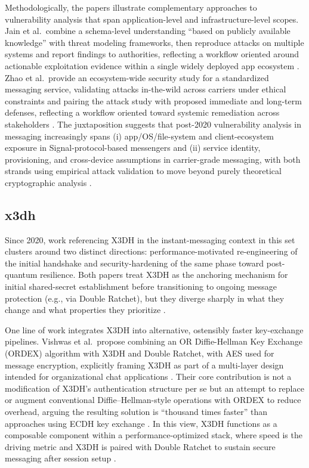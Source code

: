Methodologically, the papers illustrate complementary approaches to vulnerability analysis that span application-level and infrastructure-level scopes. Jain et al.\ combine a schema-level understanding “based on publicly available knowledge” with threat modeling frameworks, then reproduce attacks on multiple systems and report findings to authorities, reflecting a workflow oriented around actionable exploitation evidence within a single widely deployed app ecosystem \cite{jain2021}. Zhao et al.\ provide an ecosystem-wide security study for a standardized messaging service, validating attacks in-the-wild across carriers under ethical constraints and pairing the attack study with proposed immediate and long-term defenses, reflecting a workflow oriented toward systemic remediation across stakeholders \cite{zhao2022}. The juxtaposition suggests that post-2020 vulnerability analysis in messaging increasingly spans (i) app/OS/file-system and client-ecosystem exposure in Signal-protocol-based messengers and (ii) service identity, provisioning, and cross-device assumptions in carrier-grade messaging, with both strands using empirical attack validation to move beyond purely theoretical cryptographic analysis \cite{jain2021,zhao2022}.

\subsection{x3dh}
Since 2020, work referencing X3DH in the instant-messaging context in this set clusters around two distinct directions: performance-motivated re-engineering of the initial handshake and security-hardening of the same phase toward post-quantum resilience. Both papers treat X3DH as the anchoring mechanism for initial shared-secret establishment before transitioning to ongoing message protection (e.g., via Double Ratchet), but they diverge sharply in what they change and what properties they prioritize \cite{m2024,angom2025}.

One line of work integrates X3DH into alternative, ostensibly faster key-exchange pipelines. Vishwas et al.\ propose combining an OR Diffie-Hellman Key Exchange (ORDEX) algorithm with X3DH and Double Ratchet, with AES used for message encryption, explicitly framing X3DH as part of a multi-layer design intended for organizational chat applications \cite{m2024}. Their core contribution is not a modification of X3DH’s authentication structure per se but an attempt to replace or augment conventional Diffie–Hellman-style operations with ORDEX to reduce overhead, arguing the resulting solution is “thousand times faster” than approaches using ECDH key exchange \cite{m2024}. In this view, X3DH functions as a composable component within a performance-optimized stack, where speed is the driving metric and X3DH is paired with Double Ratchet to sustain secure messaging after session setup \cite{m2024}.

